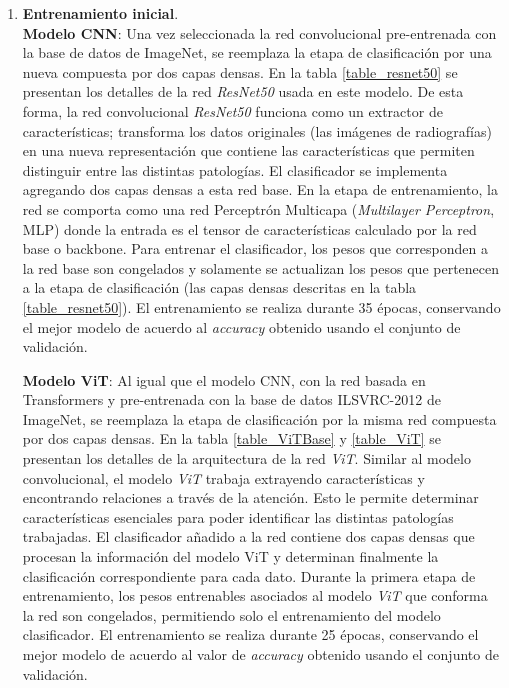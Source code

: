 \begin{enumerate}
    \item \textbf{Entrenamiento inicial}.\\
        \textbf{Modelo CNN}: Una vez seleccionada la red convolucional pre-entrenada con la base de datos de
        ImageNet, se reemplaza la etapa de clasificación por una nueva compuesta por dos capas densas. En la
        tabla \ref{table_resnet50} se presentan los detalles de la red \textit{ResNet50} usada en este modelo.
        De esta forma, la red convolucional \textit{ResNet50} funciona como un extractor de características;
        transforma los datos originales (las imágenes de radiografías) en una nueva representación que contiene
        las características que permiten distinguir entre las distintas patologías. El clasificador se implementa
        agregando dos capas densas a esta red base. En la etapa de entrenamiento, la red se comporta como una red
        Perceptrón Multicapa (\textit{Multilayer Perceptron}, MLP) donde la entrada es el tensor de características
        calculado por la red base o backbone. Para entrenar el clasificador, los pesos que corresponden a la red
        base son congelados y solamente se actualizan los pesos que pertenecen a la etapa de clasificación (las
        capas densas descritas en la tabla \ref{table_resnet50}). El entrenamiento se realiza durante 35 épocas,
        conservando el mejor modelo de acuerdo al \textit{accuracy} obtenido usando el conjunto de validación.

        \textbf{Modelo ViT}: Al igual que el modelo CNN, con la red basada en Transformers y pre-entrenada con la
        base de datos ILSVRC-2012 de ImageNet, se reemplaza la etapa de clasificación por la misma red compuesta
        por dos capas densas. En la tabla \ref{table_ViTBase} y \ref{table_ViT} se presentan los detalles de la
        arquitectura de la red \textit{ViT}. Similar al modelo convolucional, el modelo \textit{ViT} trabaja
        extrayendo características y encontrando relaciones a través de la atención. Esto le permite determinar
        características esenciales para poder identificar las distintas patologías trabajadas. El clasificador
        añadido a la red contiene dos capas densas que procesan la información del modelo ViT y determinan
        finalmente la clasificación correspondiente para cada dato. Durante la primera etapa de entrenamiento,
        los pesos entrenables asociados al modelo \textit{ViT} que conforma la red son congelados, permitiendo
        solo el entrenamiento del modelo clasificador. El entrenamiento se realiza durante 25 épocas,
        conservando el mejor modelo de acuerdo al valor de \textit{accuracy} obtenido usando el conjunto de
        validación.



\end{enumerate}
